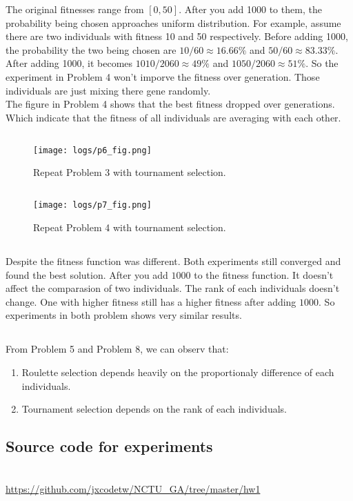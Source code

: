 \documentclass[A4]{article}
\begin{document}
The original fitnesses range from $[0, 50]$.
After you add 1000 to them, the probability being chosen approaches uniform distribution.
For example, assume there are two individuals with fitness 10 and 50 respectively.
Before adding 1000, the probability the two being chosen are $ 10 / 60 \approx 16.66\% $ and $ 50/60 \approx 83.33\% $.
After adding 1000, it becomes $ 1010/2060 \approx 49\% $ and $ 1050/2060 \approx 51\% $.
So the experiment in Problem 4 won't imporve the fitness over generation.
Those individuals are just mixing there gene randomly.
\\
The figure in Problem 4 shows that the best fitness dropped over generations.
Which indicate that the fitness of all individuals are averaging with each other.
\section{}
\label{sec:p6}

\begin{figure}[H]
\centering
\texttt{[image: logs/p6\_fig.png]}
\caption{\label{fig:p6} Repeat Problem 3 with tournament selection.}
\end{figure}

\section{}
\label{sec:p7}

\begin{figure}[H]
\centering
\texttt{[image: logs/p7\_fig.png]}
\caption{\label{fig:p7} Repeat Problem 4 with tournament selection.}
\end{figure}

\section{}
\label{sec:p8}

Despite the fitness function was different. Both experiments still converged and found the best solution.
After you add $ 1000 $ to the fitness function.
It doesn't affect the comparasion of two individuals.
The rank of each individuals doesn't change.
One with higher fitness still has a higher fitness after adding $ 1000 $.
So experiments in both problem shows very similar results.

\section{}
\label{sec:p9}
From Problem 5 and Problem 8, we can observ that:
\begin{enumerate}
\item Roulette selection depends heavily on the proportionaly difference of each individuals.
\item Tournament selection depends on the rank of each individuals.
\end{enumerate}

\begin{appendices}
\chapter{Source code for experiments}\\
\url{https://github.com/jxcodetw/NCTU_GA/tree/master/hw1}
\end{appendices}
\end{document}
